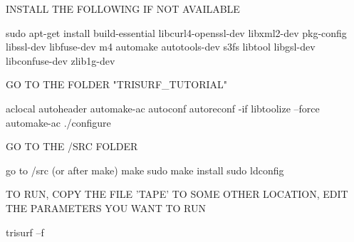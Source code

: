 
 
INSTALL THE FOLLOWING IF NOT AVAILABLE

sudo apt-get install build-essential libcurl4-openssl-dev libxml2-dev pkg-config libssl-dev libfuse-dev m4 automake autotools-dev s3fs libtool libgsl-dev libconfuse-dev  zlib1g-dev

GO TO THE FOLDER  "TRISURF_TUTORIAL"   

aclocal
autoheader
automake-ac   
autoconf
autoreconf -if
libtoolize --force
automake-ac
./configure

GO TO THE /SRC FOLDER

go to /src (or after make)
make
sudo make install
sudo ldconfig

TO RUN, COPY THE FILE 'TAPE' TO SOME OTHER LOCATION, EDIT THE PARAMETERS YOU WANT TO RUN

trisurf --f

